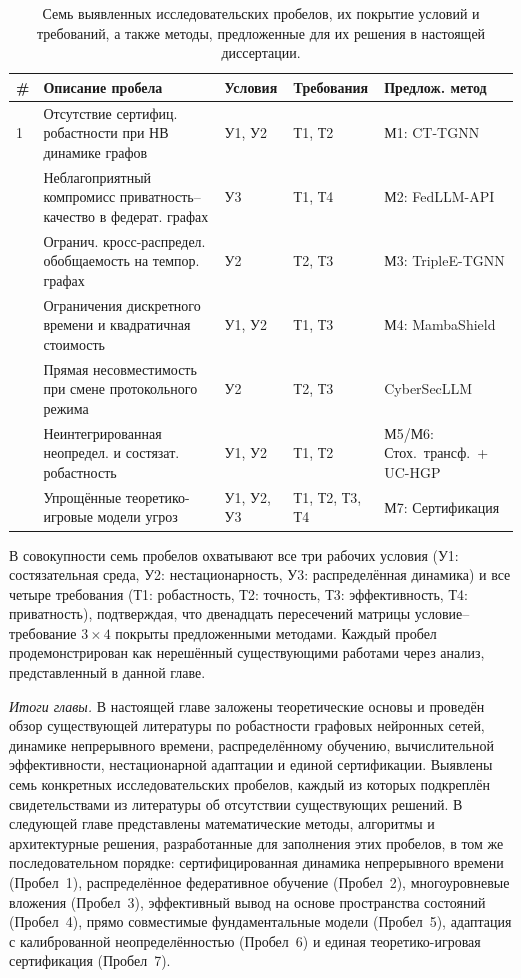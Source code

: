 \begin{table}[htbp]
\centering
\caption{Семь выявленных исследовательских пробелов, их покрытие условий и требований, а также методы, предложенные для их решения в настоящей диссертации.}
\label{tab:gaps}
\small
\begin{tabular}{p{0.5cm} p{5.5cm} p{2.5cm} p{2.0cm} p{2.5cm}}
\toprule
\textbf{\#} & \textbf{Описание пробела} & \textbf{Условия} & \textbf{Требо\-вания} & \textbf{Предлож. метод} \\
\midrule
1 & Отсутствие сертифиц. робастности при НВ динамике графов & У1, У2 & Т1, Т2 & М1: CT-TGNN \\
\addlinespace
2 & Неблагоприятный компромисс приватность--качество в федерат. графах & У3 & Т1, Т4 & М2: FedLLM-API \\
\addlinespace
3 & Огранич. кросс-распредел. обобщаемость на темпор. графах & У2 & Т2, Т3 & М3: TripleE-TGNN \\
\addlinespace
4 & Ограничения дискретного времени и квадратичная стоимость & У1, У2 & Т1, Т3 & М4: MambaShield \\
\addlinespace
5 & Прямая несовместимость при смене протокольного режима & У2 & Т2, Т3 & CyberSecLLM \\
\addlinespace
6 & Неинтегрированная неопредел. и состязат. робастность & У1, У2 & Т1, Т2 & М5/М6: Стох.\ трансф.\ + UC-HGP \\
\addlinespace
7 & Упрощённые теоретико-игровые модели угроз & У1, У2, У3 & Т1, Т2, Т3, Т4 & М7: Сертификация \\
\bottomrule
\end{tabular}
\end{table}

В совокупности семь пробелов охватывают все три рабочих условия (У1: состязательная среда, У2: нестационарность, У3: распределённая динамика) и все четыре требования (Т1: робастность, Т2: точность, Т3: эффективность, Т4: приватность), подтверждая, что двенадцать пересечений матрицы условие--требование $3\times4$ покрыты предложенными методами. Каждый пробел продемонстрирован как нерешённый существующими работами через анализ, представленный в данной главе.

\medskip
\noindent\textit{Итоги главы.} В настоящей главе заложены теоретические основы и проведён обзор существующей литературы по робастности графовых нейронных сетей, динамике непрерывного времени, распределённому обучению, вычислительной эффективности, нестационарной адаптации и единой сертификации. Выявлены семь конкретных исследовательских пробелов, каждый из которых подкреплён свидетельствами из литературы об отсутствии существующих решений. В следующей главе представлены математические методы, алгоритмы и архитектурные решения, разработанные для заполнения этих пробелов, в том же последовательном порядке: сертифицированная динамика непрерывного времени (Пробел~1), распределённое федеративное обучение (Пробел~2), многоуровневые вложения (Пробел~3), эффективный вывод на основе пространства состояний (Пробел~4), прямо совместимые фундаментальные модели (Пробел~5), адаптация с калиброванной неопределённостью (Пробел~6) и единая теоретико-игровая сертификация (Пробел~7).

